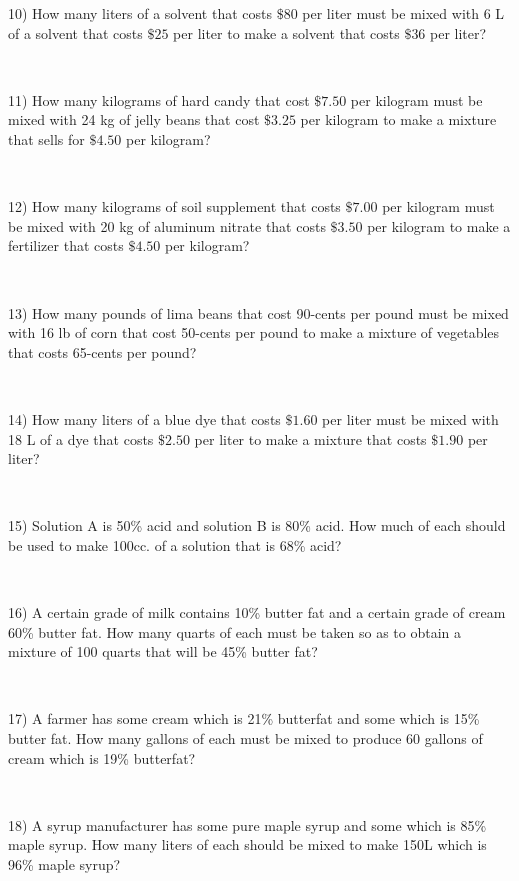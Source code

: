 {10) How many liters of a solvent that costs $\$80$ per liter must be
mixed with 6 L of a solvent that costs $\$25$ per liter
to make a solvent that costs $\$36$ per liter?\par
~\par

11) How many kilograms of hard candy that cost $\$7.50$ per kilogram
must be mixed with 24 kg of jelly beans that cost
$\$3.25$ per kilogram to make a mixture
that sells for $\$4.50$ per kilogram?\par
~\par

12) How many kilograms of soil supplement that costs $\$7.00$ per
kilogram must be mixed with 20 kg of aluminum nitrate that
costs $\$3.50$ per kilogram to make a fertilizer
that costs $\$4.50$ per kilogram?\par
~\par

13) How many pounds of lima beans that cost 90-cents per pound must be
mixed with  16 lb of corn that cost 50-cents per pound to make
a mixture of vegetables that costs 65-cents per
pound?\par
~\par

14) How many liters of a blue dye that costs $\$1.60$ per liter must
be mixed with 18 L of a dye that costs $\$2.50$ per
liter to make a mixture that costs $\$1.90$ per liter?\par
~\par

15) Solution A is 50\% acid and solution B is 80\% acid. How much of each
should be used to make 100cc. of a solution that is 68\% acid?\par
~\par

16) A certain grade of milk contains 10\% butter fat and a certain grade of
cream 60\% butter fat. How many quarts of each must be taken so
as to obtain a mixture of 100 quarts that will be 45\%
butter fat?\par
~\par

17) A farmer has some cream which is 21\% butterfat and some which is 15\% butter fat. How many gallons of each must be mixed to
produce 60 gallons of cream which is 19\% butterfat?\par
~\par

18) A syrup manufacturer has some pure maple syrup and some which is 85\% maple syrup. How many liters of each should be mixed to make
150L which  is 96\% maple syrup?\par
~\par

}
